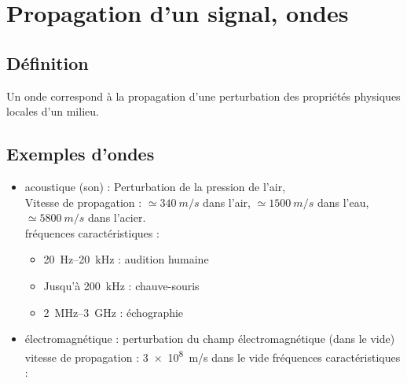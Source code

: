\documentclass[MPSI]{cours}
\begin{document}
\setcounter{chapter}{8}
\chapter{Propagation d'un signal, ondes}
\section{Définition}
Un onde correspond à la propagation d'une perturbation des propriétés physiques locales d'un milieu.
\section{Exemples d'ondes}
\begin{itemize}
\item acoustique (son) : Perturbation de la pression de l'air,\\
Vitesse de propagation : $\simeq \SI{340}{m/s}$ dans l'air, $\simeq \SI{1500}{m/s}$ dans l'eau, $\simeq \SI{5800}{m/s}$ dans l'acier. \\
fréquences caractéristiques : 
\begin{itemize}
\item \SI{20}{Hz}--\SI{20}{kHz} : audition humaine
\item Jusqu'à \SI{200}{kHz} : chauve-souris
\item \SI{2}{MHz}--\SI{3}{GHz} : échographie
\end{itemize}

\item électromagnétique : perturbation du champ électromagnétique (dans le vide)\\
vitesse de propagation : \SI{3e8}{m/s} dans le vide
fréquences caractéristiques : 

\end{itemize}
\end{document}
